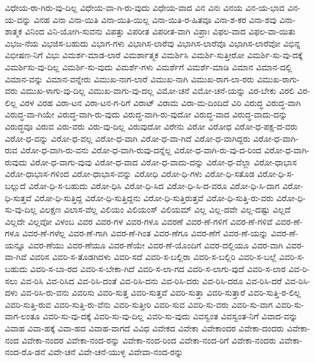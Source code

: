 {ವಿಧೇಯ-ರಾ-ಗಿರು-ವು-ದಿಲ್ಲ
ವಿಧೇಯ-ವಾ-ಗಿ-ರು-ವುದು
ವಿಧೇಯ-ವಾದ
ವಿನ
ವಿನಃ
ವಿನಯ
ವಿನ-ಯ-ಭಾವ
ವಿನ-ಯ-ವನ್ನು
ವಿನಹ
ವಿನಾ
ವಿನಾ-ಯಿತಿ
ವಿನಾ-ಯಿತಿ-ಯಿಲ್ಲ
ವಿನಾ-ಯಿತಿ-ರ-ಹಿತವೂ
ವಿನಾ-ಶ-ಕರ
ವಿನಾ-ಶವು
ವಿನಾ-ಶಾತ್ಮಕ
ವಿನಿಂದ
ವಿನಿ-ಯೋಗಿ-ಸುವನು
ವಿಪತ್ತು
ವಿಪರೀತ
ವಿಪರೀತ-ವಾಗಿ
ವಿಪ್ರಾಃ
ವಿಫಲ-ವಾದ
ವಿಫಲ-ವಾ-ಯಿತು
ವಿಭಜ-ನೆಯ
ವಿಭಜಿಸ-ಬಹುದು
ವಿಭಾಗ-ಗಳು
ವಿಭಾಗಿಸ-ಲಾರೆವು
ವಿಭಾಗಿಸ-ಲಾರೆವೊ
ವಿಭಾಗಿಸ-ಲಾರೆವೋ
ವಿಭಿನ್ನ
ವಿಭೀಷಣ-ನಿಗೆ
ವಿಭು
ವಿಮರ್ಶ-ಮಾಡ-ಲಾರೆ
ವಿಮರ್ಶಾತ್ಮಕ
ವಿಮರ್ಶಿಸಿ
ವಿಮರ್ಶಿ-ಸುತ್ತೀರೋ
ವಿಮರ್ಶಿ-ಸು-ವು-ದಕ್ಕೆ
ವಿಮರ್ಶಿಸು-ವು-ದಿಲ್ಲ
ವಿಮರ್ಶಿ-ಸು-ವುದು
ವಿಮರ್ಶೆ-ಗಳು
ವಿಮರ್ಶೆಗೆ
ವಿಮರ್ಶೆ-ಮಾಡಿ
ವಿಮಾನ
ವಿಮಾನ-ದಲ್ಲಿ
ವಿಮಾನ-ವನ್ನು
ವಿಮಾನ-ವನ್ನೇರು
ವಿಮುಖ-ನಾಗ-ಲಾರೆ
ವಿಮುಖ-ನಾಗಿ
ವಿಮುಖ-ರಾಗ-ಲಾ-ರರು
ವಿಮುಖ-ರಾಗು-ವರು
ವಿಮುಖ-ಳಾಗು-ವು-ದಿಲ್ಲ
ವಿಮುಖ-ವಾಗು-ವು-ದಲ್ಲ
ವಿಮೋ-ಚನೆ
ವಿಮೋ-ಚನೆ-ಯನ್ನು
ವಿರ-ಬೇಕು
ವಿರಲಿ
ವಿರ-ಲಿಲ್ಲ
ವಿರಳ
ವಿರಹ
ವಿರಾ-ಟನ
ವಿರಾ-ಟನ-ಗ-ರಿಗೆ
ವಿರಾಟ್
ವಿರಾಮ
ವಿರಾ-ಮ-ದಿಂದಿದೆ
ವಿರಿ
ವಿರುದ್ಧ
ವಿರುದ್ಧ-ವಾಗಿ
ವಿರುದ್ಧ-ವಾ-ಗಿಯೇ
ವಿರುದ್ಧ-ವಾಗಿ-ರು-ವುದು
ವಿರುದ್ಧ-ವಾಗಿ-ರು-ವುದೋ
ವಿರುದ್ಧ-ವಾದ
ವಿರುದ್ಧ-ವಾದು-ದನ್ನು
ವಿರುದ್ಧವೂ
ವಿರುವ
ವಿರು-ವರು
ವಿರು-ವು-ದಿಲ್ಲ
ವಿರುವುದೋ
ವಿರೇನು
ವಿರೋ
ವಿರೋಧ
ವಿರೋ-ಧ-ಪಕ್ಷ-ದ-ವರು
ವಿರೋ-ಧ-ವನ್ನು
ವಿರೋ-ಧ-ವಲ್ಲ
ವಿರೋ-ಧ-ವಾಗಿ
ವಿರೋ-ಧ-ವಾ-ಗಿದೆ
ವಿರೋ-ಧ-ವಾಗಿದ್ದರು
ವಿರೋ-ಧ-ವಾಗಿ-ರುವ
ವಿರೋ-ಧ-ವಾಗಿ-ರು-ವನು
ವಿರೋ-ಧ-ವಾಗಿ-ರುವು-ದನ್ನೆಲ್ಲ
ವಿರೋ-ಧ-ವಾಗಿ-ರು-ವು-ದ-ರಿಂದ
ವಿರೋ-ಧ-ವಾಗಿ-ರುವುದು
ವಿರೋ-ಧ-ವಾಗು-ವುವು
ವಿರೋ-ಧ-ವಾದ
ವಿರೋ-ಧ-ವಾದು-ದನ್ನು
ವಿರೋ-ಧ-ವೆಲ್ಲಾ
ವಿರೋ-ಧಾಭಾಸ
ವಿರೋ-ಧಾಭಾಸ-ಗಳಿಂದ
ವಿರೋ-ಧಾಭಾಸ-ವನ್ನು
ವಿರೋಧಿ
ವಿರೋ-ಧಿ-ಗಳು
ವಿರೋ-ಧಿ-ಸತೊಡ
ವಿರೋ-ಧಿ-ಸ-ಬಲ್ಲುದೆ
ವಿರೋ-ಧಿ-ಸ-ಬಹುದು
ವಿರೋ-ಧಿಸಿ
ವಿರೋ-ಧಿ-ಸಿದ
ವಿರೋ-ಧಿ-ಸಿ-ದ-ವರೂ
ವಿರೋ-ಧಿ-ಸಿ-ದಾಗ
ವಿರೋ-ಧಿ-ಸುತ್ತವೆ
ವಿರೋ-ಧಿ-ಸುತ್ತಿದ್ದ
ವಿರೋ-ಧಿ-ಸುತ್ತಿದ್ದನು
ವಿರೋ-ಧಿ-ಸುತ್ತಿರುತ್ತವೆ
ವಿರೋ-ಧಿ-ಸುತ್ತಿ-ರು-ವರು
ವಿರೋ-ಧಿ-ಸು-ವು-ದಿಲ್ಲ
ವಿಲಕ್ಷಣ
ವಿಲಾಸ-ವೆಲ್ಲ
ವಿಲಿಯಂ
ವಿಲಿಯಂಸ್
ವಿಲಿಯಮ್
ವಿಲ್ಲ
ವಿಲ್ಲ-ದವೇ
ವಿಲ್ಲ-ದಷ್ಟು
ವಿಲ್ಲದೆ
ವಿಲ್ಲದೇ
ವಿಲ್ಲವೋ
ವಿಳಂಬ
ವಿವರ
ವಿವರ-ಗಳ
ವಿವರ-ಗಳೂ
ವಿವರಣೆ
ವಿವರ-ಣೆ-ಗಳಿಗೆ
ವಿವರ-ಣೆ-ಗಳಿವೆ
ವಿವರ-ಣೆ-ಗಳೂ
ವಿವರ-ಣೆ-ಗಳೆಲ್ಲ
ವಿವರ-ಣೆ-ಗಾಗಿ
ವಿವರ-ಣೆ-ಗಿಂತ
ವಿವರ-ಣೆಗೂ
ವಿವರ-ಣೆಗೆ
ವಿವರ-ಣೆ-ಯನ್ನು
ವಿವರ-ಣೆ-ಯನ್ನೂ
ವಿವರ-ಣೆಯು
ವಿವರ-ಣೆಯೂ
ವಿವರ-ಣೆಯೇ
ವಿವರ-ಣೆ-ಯೊಂದಿಗೆ
ವಿವರ-ದಲ್ಲಿಯೂ
ವಿವರ-ವಾಗಿ
ವಿವರ-ವಾ-ಗಿವೆ
ವಿವರಿಸ
ವಿವರಿ-ಸ-ತೊಡಗಿದಳು
ವಿವರಿ-ಸದೆ
ವಿವರಿ-ಸ-ಬಲ್ಲಿರಾ
ವಿವರಿ-ಸ-ಬಲ್ಲಿರಿ
ವಿವರಿ-ಸ-ಬಲ್ಲೆ
ವಿವರಿ-ಸ-ಬಹುದು
ವಿವರಿ-ಸ-ಬಾ-ರದ
ವಿವರಿ-ಸ-ಬೇಕಾ-ಗಿದೆ
ವಿವರಿ-ಸ-ಲಾ-ಗದ
ವಿವರಿ-ಸ-ಲಾಗು-ವುದೆ
ವಿವರಿ-ಸ-ಲಾರ
ವಿವ-ರಿ-ಸಲು
ವಿವ-ರಿಸಿ
ವಿವ-ರಿಸಿದ
ವಿವ-ರಿಸಿ-ದಂತೆ
ವಿವ-ರಿಸಿ-ದನು
ವಿವ-ರಿಸಿ-ದರು
ವಿವ-ರಿಸಿ-ದರೂ
ವಿವ-ರಿಸಿ-ದರೆ
ವಿವ-ರಿಸಿ-ದಳು
ವಿವ-ರಿಸಿ-ರು-ವನು
ವಿವರಿಸು
ವಿವರಿ-ಸುತ್ತ
ವಿವರಿ-ಸುತ್ತವೆ
ವಿವರಿ-ಸುತ್ತಾ
ವಿವರಿ-ಸುತ್ತಾರೆ
ವಿವರಿ-ಸುತ್ತಿ-ರ-ಲಿಲ್ಲ
ವಿವರಿ-ಸುತ್ತಿ-ರುವ
ವಿವರಿ-ಸುತ್ತಿ-ರು-ವೆನು
ವಿವರಿ-ಸುತ್ತೀರಿ
ವಿವರಿ-ಸುವ
ವಿವರಿ-ಸು-ವರು
ವಿವರಿ-ಸು-ವಾಗ
ವಿವರಿ-ಸು-ವಾಗ-ಲಂತೂ
ವಿವರಿ-ಸು-ವು-ದಕ್ಕೆ
ವಿವರಿ-ಸು-ವು-ದಿಲ್ಲ
ವಿವರಿ-ಸು-ವುದು
ವಿವಸ್ವಂತ
ವಿವಸ್ವಂತ-ನಿಗೆ
ವಿವಾದ-ವನ್ನು
ವಿವಾಹ
ವಿವಾ-ಹಕ್ಕೆ
ವಿವಾ-ಹದ
ವಿವಾಹ-ವಾಗದೆ
ವಿವಿಧ
ವಿವೇಕದ
ವಿವೇಕಾ
ವಿವೇಕಾಂದರ
ವಿವೇಕಾ-ದಂದರು
ವಿವೇಕಾ-ನಂದ
ವಿವೇಕಾ-ನಂದರ
ವಿವೇಕಾ-ನಂದ-ರನ್ನು
ವಿವೇಕಾ-ನಂದ-ರಿಂದ
ವಿವೇಕಾ-ನಂದ-ರಿಗೆ
ವಿವೇಕಾ-ನಂದರು
ವಿವೇಕಾ-ನಂದ-ರೊ-ಡನೆ
ವಿವೇ-ಚನೆ
ವಿವೇ-ಚನೆ-ಯುಳ್ಳ
ವಿವೇವಾ-ನಂದ-ರನ್ನು
}
